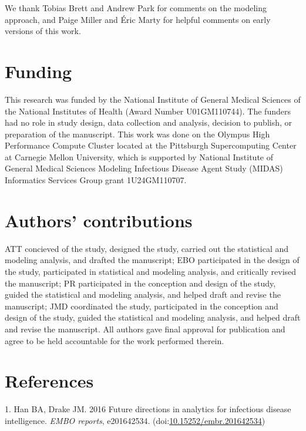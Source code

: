 \documentclass[3p]{elsarticle} %
\begin{document}
We thank Tobias Brett and Andrew Park for comments on the modeling
approach, and Paige Miller and Éric Marty for helpful comments on early
versions of this work.

\hypertarget{funding}{%
\section{Funding}\label{funding}}

This research was funded by the National Institute of General Medical
Sciences of the National Institutes of Health (Award Number
U01GM110744). The funders had no role in study design, data collection
and analysis, decision to publish, or preparation of the manuscript.
This work was done on the Olympus High Performance Compute Cluster
located at the Pittsburgh Supercomputing Center at Carnegie Mellon
University, which is supported by National Institute of General Medical
Sciences Modeling Infectious Disease Agent Study (MIDAS) Informatics
Services Group grant 1U24GM110707.

\hypertarget{authors-contributions}{%
\section{Authors' contributions}\label{authors-contributions}}

ATT concieved of the study, designed the study, carried out the
statistical and modeling analysis, and drafted the manuscript; EBO
participated in the design of the study, participated in statistical and
modeling analysis, and critically revised the manuscript; PR
participated in the conception and design of the study, guided the
statistical and modeling analysis, and helped draft and revise the
manuscript; JMD coordinated the study, participated in the conception
and design of the study, guided the statistical and modeling analysis,
and helped draft and revise the manuscript. All authors gave final
approval for publication and agree to be held accountable for the work
performed therein.

\hypertarget{references}{%
\section*{References}\label{references}}

\hypertarget{refs}{}
\leavevmode\hypertarget{ref-Han2016}{}%
1. Han BA, Drake JM. 2016 Future directions in analytics for infectious
disease intelligence. \emph{EMBO reports}, e201642534.
(doi:\href{https://doi.org/10.15252/embr.201642534}{10.15252/embr.201642534})
\end{document}
